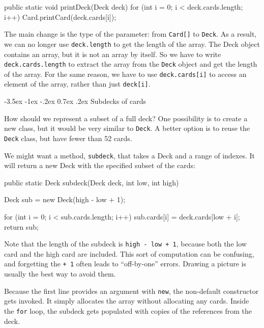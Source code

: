 \documentclass[12pt]{book}
\makeatletter
\theoremstyle{exercise}
\newcommand{\java}[1]{\verb"#1"}
\renewcommand{\section}{\@startsection{section}{1}{\z@}%
    {-3.5ex \@plus -1ex \@minus -.2ex}%
    {0.7ex \@plus.2ex}%
    {\normalfont\Large\bfseries}}
\newcommand{\java}[1]{\lstinline{#1}} %
\makeatother
\begin{document}
\begin{code}
    public static void printDeck(Deck deck) {
        for (int i = 0; i < deck.cards.length; i++) {
            Card.printCard(deck.cards[i]);
        }
    }
\end{code}

The main change is the type of the parameter: from \java{Card[]} to \java{Deck}.
As a result, we can no longer use \java{deck.length} to get the length of the array.
The Deck object contains an array, but it is not an array by itself.
So we have to write \java{deck.cards.length} to extract the array from the \java{Deck} object and get the length of the array.
For the same reason, we have to use \java{deck.cards[i]} to access an element of the array, rather than just \java{deck[i]}.


\section{Subdecks of cards}

How should we represent a subset of a full deck?
One possibility is to create a new class, but it would be very similar to \java{Deck}.
A better option is to reuse the \java{Deck} class, but have fewer than 52 cards.

We might want a method, \java{subdeck}, that takes a Deck and a range of indexes.
It will return a new Deck with the specified subset of the cards:

\begin{code}
public static Deck subdeck(Deck deck, int low, int high) {
    Deck sub = new Deck(high - low + 1);

    for (int i = 0; i < sub.cards.length; i++) {
        sub.cards[i] = deck.cards[low + i];
    }
    return sub;
}
\end{code}

Note that the length of the subdeck is \java{high - low + 1}, because both the low card and the high card are included.
This sort of computation can be confusing, and forgetting the \java{+ 1} often leads to ``off-by-one'' errors.
Drawing a picture is usually the best way to avoid them.


Because the first line provides an argument with \java{new}, the non-default constructor gets invoked.
It simply allocates the array without allocating any cards.
Inside the \java{for} loop, the subdeck gets populated with copies of the references from the deck.
\end{document}
